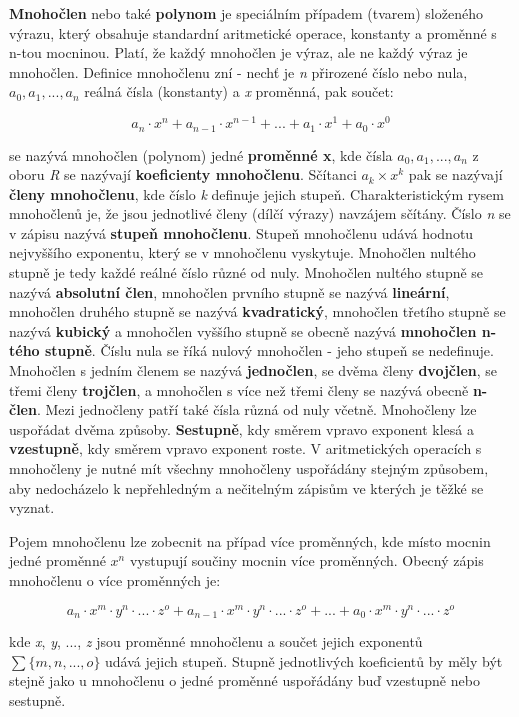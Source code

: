 {\bf Mnohočlen} nebo také {\bf polynom} je speciálním případem (tvarem) složeného výrazu, který obsahuje standardní aritmetické operace, konstanty a proměnné s n-tou mocninou. Platí, že každý mnohočlen je výraz, ale ne každý výraz je mnohočlen. Definice mnohočlenu zní - nechť je {\it n} přirozené číslo nebo nula, $ a_0, a_1, ..., a_n$ reálná čísla (konstanty) a {\it x} proměnná, pak součet:

$$ a_n \cdot x^n + a_{n-1} \cdot x^{n-1} + ... + a_1 \cdot x^1 + a_0 \cdot x^0  $$

se nazývá  mnohočlen (polynom) jedné {\bf proměnné x}, kde čísla $a_0, a_1, ..., a_n$ z oboru {\it R} se nazývají {\bf koeficienty mnohočlenu}. Sčítanci $ a_k\times x^k $ pak se nazývají {\bf členy mnohočlenu}, kde číslo {\it k} definuje jejich stupeň. Charakteristickým rysem mnohočlenů je, že jsou jednotlivé členy (dílčí výrazy) navzájem sčítány. Číslo {\it n} se v zápisu nazývá {\bf stupeň mnohočlenu}. Stupeň mnohočlenu udává hodnotu nejvyššího exponentu, který se v mnohočlenu vyskytuje. Mnohočlen nultého stupně je tedy každé reálné číslo různé od nuly. Mnohočlen nultého stupně se nazývá {\bf absolutní člen}, mnohočlen prvního stupně se nazývá {\bf lineární}, mnohočlen druhého stupně se nazývá {\bf kvadratický}, mnohočlen třetího stupně se nazývá {\bf kubický} a mnohočlen vyššího stupně se obecně nazývá {\bf mnohočlen n-tého stupně}. Číslu nula se říká nulový mnohočlen - jeho stupeň se nedefinuje. Mnohočlen s jedním členem se nazývá {\bf jednočlen}, se dvěma členy {\bf dvojčlen}, se třemi členy {\bf trojčlen}, a mnohočlen s více než třemi členy se nazývá obecně {\bf n-člen}. Mezi jednočleny patří také čísla různá od nuly včetně. Mnohočleny lze uspořádat dvěma způsoby. {\bf Sestupně}, kdy směrem vpravo exponent klesá a {\bf vzestupně}, kdy směrem vpravo exponent roste. V aritmetických operacích s mnohočleny je nutné mít všechny mnohočleny uspořádány stejným způsobem, aby nedocházelo k nepřehledným a nečitelným zápisům ve kterých je těžké se vyznat.

Pojem mnohočlenu lze zobecnit na případ více proměnných, kde místo mocnin jedné proměnné $x^n$ vystupují součiny mocnin více proměnných. Obecný zápis mnohočlenu o více proměnných je:

$$ a_n \cdot x^m\cdot y^n \cdot ... \cdot z^o + a_{n-1} \cdot x^m\cdot y^n \cdot ... \cdot z^o + ... + a_0 \cdot x^m\cdot y^n \cdot ... \cdot z^o $$

kde {\it x}, {\it y}, ..., {\it z} jsou proměnné mnohočlenu a součet jejich exponentů $\sum \{m, n, ..., o\}$ udává jejich stupeň. Stupně jednotlivých koeficientů by měly být stejně jako u mnohočlenu o jedné proměnné uspořádány buď vzestupně nebo sestupně.

